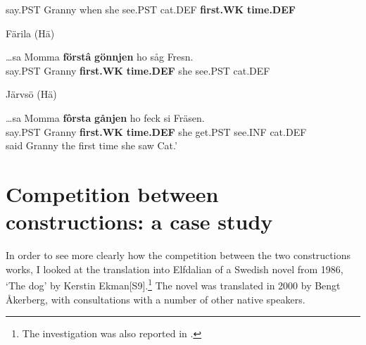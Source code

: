 say.PST  Granny  when  she  see.PST  cat.DEF  \textbf{first.WK} \textbf{time.DEF}\\

\item 

Färila (Hä)



 \ea\label{}
\gll …sa  Momma  \textbf{förstâ} \textbf{gönnjen} ho  såg  Fresn.\\


say.PST  Granny  \textbf{first.WK} \textbf{time.DEF} she  see.PST  cat.DEF\\

\item 

Järvsö (Hä)



 \ea\label{}
\gll …sa  Momma  \textbf{fôrsta}\textbf{  gånjen} ho  feck  si  Fräsen.\\


say.PST  Granny  \textbf{first.WK} \textbf{time.DEF} she  get.PST  see.INF  cat.DEF\\

 said Granny the first time she saw Cat.’

\z

\section{\rmfamily Competition between constructions: a case study}

In order to see more clearly how the competition between the two constructions works, I looked at the translation into Elfdalian of a Swedish novel from 1986,  ‘The dog’ by Kerstin Ekman[S9].\footnote{ The investigation was also reported in \citet{Dahl2004}.} The novel was translated in 2000 by Bengt Åkerberg, with consultations with a number of other native speakers. 

